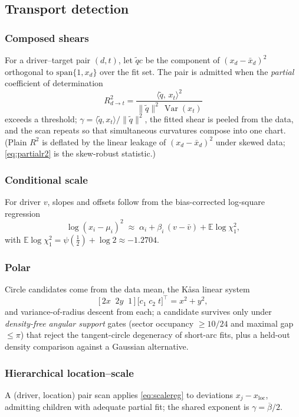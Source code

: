 \documentclass[10pt,journal,compsoc]{IEEEtran}
\newcommand{\E}{\mathbb{E}}
\begin{document}
\subsection{Transport detection}
\subsubsection{Composed shears} For a driver--target pair $(d,t)$, let
$\tilde qc$ be the component of $(x_d-\bar x_d)^2$ orthogonal to
$\mathrm{span}\{1,x_d\}$ over the fit set. The pair is admitted when the
\emph{partial} coefficient of determination
\begin{equation}
R^2_{d\to t}
=\frac{\langle \tilde q,\,x_t\rangle^2}
{\lVert\tilde q\rVert^2\,\operatorname{Var}(x_t)}
\label{eq:partialr2}
\end{equation}
exceeds a threshold; $\gamma=\langle\tilde q,x_t\rangle/\lVert\tilde
q\rVert^2$, the fitted shear is peeled from the data, and the scan repeats
so that simultaneous curvatures compose into one chart. (Plain $R^2$ is
deflated by the linear leakage of $(x_d-\bar x_d)^2$ under skewed data;
\eqref{eq:partialr2} is the skew-robust statistic.)
\subsubsection{Conditional scale} For driver $v$, slopes and offsets follow
from the bias-corrected log-square regression
\begin{equation}
\log(x_i-\mu_i)^2 \;\approx\; \alpha_i+\beta_i\,(v-\bar v)
+\E\log\chi^2_1,
\label{eq:scalereg}
\end{equation}
with $\E\log\chi^2_1=\psi(\tfrac12)+\log2\approx-1.2704$.
\subsubsection{Polar} Circle candidates come from the data mean, the
K\r{a}sa linear system \cite{kasa1976}
\begin{equation}
\bigl[\,2x\;\;2y\;\;1\,\bigr]\,
\bigl[c_1\;c_2\;t\bigr]^\top\!=x^2+y^2,
\label{eq:kasa}
\end{equation}
and variance-of-radius descent from each; a candidate survives only under
\emph{density-free angular support} gates (sector occupancy $\ge10/24$ and
maximal gap $\le\pi$) that reject the tangent-circle degeneracy of
short-arc fits, plus a held-out density comparison against a Gaussian
alternative.
\subsubsection{Hierarchical location--scale} A (driver, location) pair scan
applies \eqref{eq:scalereg} to deviations $x_j-x_{\mathrm{loc}}$, admitting
children with adequate partial fit; the shared exponent is
$\gamma=\overline{\beta}/2$.
\end{document}
